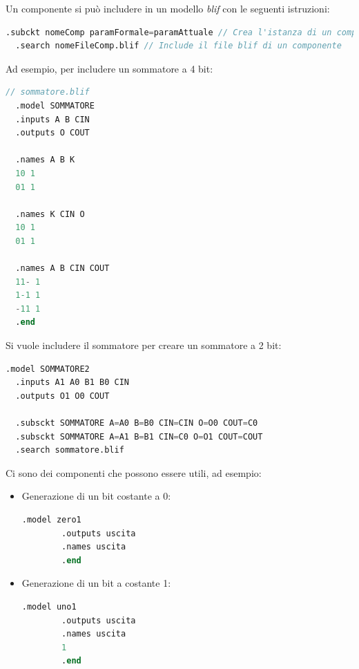 \documentclass[a4paper]{article}
\theoremstyle{break}
\theoremstyle{break}
\theoremstyle{break}
\theoremstyle{break}
\begin{document}
Un componente si può includere in un modello \emph{blif} con le seguenti istruzioni:
\begin{center}
  \begin{lstlisting}[language=Verilog]
  .subckt nomeComp paramFormale=paramAttuale // Crea l'istanza di un componente
  .search nomeFileComp.blif // Include il file blif di un componente
  \end{lstlisting}
\end{center}
Ad esempio, per includere un sommatore a 4 bit:
\begin{center}
  \begin{lstlisting}[language=Verilog]
  // sommatore.blif
  .model SOMMATORE
  .inputs A B CIN
  .outputs O COUT

  .names A B K
  10 1
  01 1

  .names K CIN O
  10 1
  01 1

  .names A B CIN COUT
  11- 1
  1-1 1
  -11 1
  .end
  \end{lstlisting}
\end{center}
Si vuole includere il sommatore per creare un sommatore a 2 bit:
\begin{center}
  \begin{lstlisting}[language=Verilog]
  .model SOMMATORE2
  .inputs A1 A0 B1 B0 CIN
  .outputs O1 O0 COUT
  
  .subsckt SOMMATORE A=A0 B=B0 CIN=CIN O=O0 COUT=C0
  .subsckt SOMMATORE A=A1 B=B1 CIN=C0 O=O1 COUT=COUT
  .search sommatore.blif

  \end{lstlisting}
\end{center}
Ci sono dei componenti che possono essere utili, ad esempio:
\begin{itemize}
  \item Generazione di un bit costante a 0:
    \begin{center}
      \begin{lstlisting}[language=Verilog]
        .model zero1
        .outputs uscita
        .names uscita
        .end
      \end{lstlisting}
    \end{center}
  \item Generazione di un bit a costante 1:
    \begin{center}
      \begin{lstlisting}[language=Verilog]
        .model uno1
        .outputs uscita
        .names uscita
        1
        .end
      \end{lstlisting}
    \end{center}
\end{itemize}
\end{document}
